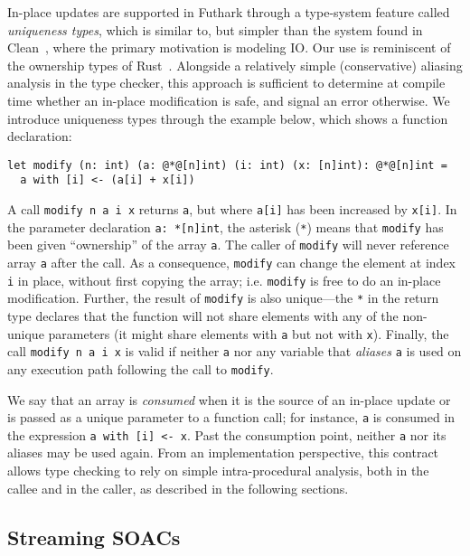 In-place updates are supported in Futhark through a type-system
feature called \textit{uniqueness types}, which is similar to, but
simpler than the system found in
Clean~\cite{clean-uniqueness-types,barendsen1996uniqueness}, where the
primary motivation is modeling IO.  Our use is reminiscent of the
ownership types of Rust~\cite{rust}.  Alongside a relatively simple
(conservative) aliasing analysis in the type checker, this approach is
sufficient to determine at compile time whether an in-place
modification is safe, and signal an error otherwise.  We introduce
uniqueness types through the example below, which shows a function
declaration: {\small
\begin{lstlisting}
let modify (n: int) (a: @*@[n]int) (i: int) (x: [n]int): @*@[n]int =
  a with [i] <- (a[i] + x[i])
\end{lstlisting}
} A call \lstinline{modify n a i x} returns \lstinline{a}, but where
\lstinline{a[i]} has been increased by \lstinline{x[i]}.  In the
parameter declaration \lstinline{a: *[n]int}, the asterisk
(\lstinline{*}) means that \lstinline{modify} has been given
``ownership'' of the array \lstinline{a}. The caller of
\lstinline{modify} will never reference array \lstinline{a} after the
call.  As a consequence, \lstinline{modify} can change the element at
index \lstinline{i} in place, without first copying the array;
i.e. \lstinline{modify} is free to do an in-place modification.
Further, the result of \lstinline{modify} is also unique---the
\lstinline{*} in the return type declares that the function will not
share elements with any of the non-unique parameters (it might share
elements with \lstinline{a} but not with \lstinline{x}).
Finally, the call \lstinline!modify n a i x! is valid if neither
\lstinline{a} nor any variable that \textit{aliases} \lstinline{a} is
used on any execution path following the call to \lstinline{modify}.


We say that an array is \textit{consumed} when it is the source of an
in-place update or is passed as a unique parameter to a function call;
for instance, \lstinline{a} is consumed in the expression \lstinline{a with [i] <- x}.
Past the consumption point, neither \lstinline{a} nor its aliases may
be used again.  From an implementation perspective, this contract
allows type checking to rely on simple intra-procedural analysis, both
in the callee and in the caller, as described in the following
sections.

\subsection{Streaming SOACs}
\label{sec:streaming-soacs}

